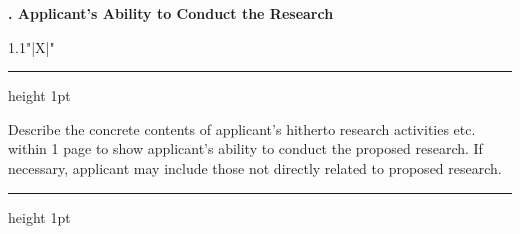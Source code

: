 \documentclass[8pt]{extarticle}
\makeatletter
\newcommand{\thickhline}{%
	\noalign {\ifnum 0=`}\fi \hrule height 1pt
	\futurelet \reserved@a \@xhline
}
\makeatother
\begin{document}
	
\noindent\textbf{\fontsize{12}{12}. Applicant's Ability to Conduct the Research}\\
\begin{tabularx}{1.1\linewidth}{"|X|"}
	\thickhline
	Describe the concrete contents of applicant's hitherto research activities etc. within 1 page to show applicant's ability to conduct the proposed research. If necessary, applicant may include those not directly related to proposed research.
	\\
	\thickhline
\end{tabularx}
\end{document}
